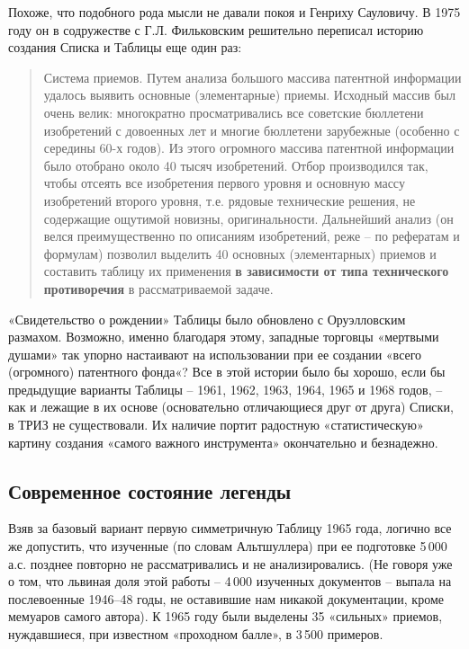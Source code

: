 \documentclass[11pt,a4paper]{article}
\begin{document}
Похоже, что подобного рода мысли не давали покоя и Генриху Сауловичу. В 1975
году он в содружестве с Г.Л. Фильковским решительно переписал историю создания
Списка и Таблицы еще один раз:
\begin{quote}
  Система приемов. Путем анализа большого массива патентной информации удалось
  выявить основные (элементарные) приемы. Исходный массив был очень велик:
  многократно просматривались все советские бюллетени изобретений с довоенных
  лет и многие бюллетени зарубежные (особенно с середины 60-х годов). Из этого
  огромного массива патентной информации было отобрано около 40 тысяч
  изобретений.  Отбор производился так, чтобы отсеять все изобретения первого
  уровня и основную массу изобретений второго уровня, т.е. рядовые технические
  решения, не содержащие ощутимой новизны, оригинальности. Дальнейший анализ
  (он велся преимущественно по описаниям изобретений, реже -- по рефератам и
  формулам) позволил выделить 40 основных (элементарных) приемов и составить
  таблицу их применения \textbf{в зависимости от типа технического
    противоречия} в рассматриваемой задаче. \cite{Altshuller1975}
\end{quote}
«Свидетельство о рождении» Таблицы было обновлено с Оруэлловским размахом.
Возможно, именно благодаря этому, западные торговцы «мертвыми душами» так
упорно настаивают на использовании при ее создании «всего (огромного)
патентного фонда«? Все в этой истории было бы хорошо, если бы предыдущие
варианты Таблицы -- 1961, 1962, 1963, 1964, 1965 и 1968 годов, -- как и
лежащие в их основе (основательно отличающиеся друг от друга) Списки, в ТРИЗ
не существовали. Их наличие портит радостную «статистическую» картину создания
«самого важного инструмента» окончательно и безнадежно.

\subsection*{Современное состояние легенды}

Взяв за базовый вариант первую симметричную Таблицу 1965 года, логично все же
допустить, что изученные (по словам Альтшуллера) при ее подготовке 5\,000 а.с.
позднее повторно не рассматривались и не анализировались. (Не говоря уже о
том, что львиная доля этой работы -- 4\,000 изученных документов -- выпала на
послевоенные 1946--48 годы, не оставившие нам никакой документации, кроме
мемуаров самого автора). К 1965 году были выделены 35 «сильных» приемов,
нуждавшиеся, при известном «проходном балле», в 3\,500 примеров.
\end{document}
